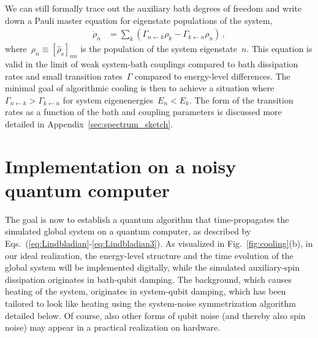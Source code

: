 \documentclass[twocolumn,amsmath,amssymb,pra]{revtex4-2}
\begin{document}
We can still formally trace out the auxiliary bath degrees of freedom and write down  
a Pauli master equation for eigenstate populations of the system,
\begin{align}
\dot\rho_{n} &=  \sum_k \left(\Gamma_{n\leftarrow k} \rho_{k} - \Gamma_{k\leftarrow n} \rho_{n}\right) \, ,
\end{align}
where~$\rho_n \equiv [\hat\rho_\textrm{s}]_{nn}$ is the population of the system eigenstate~$n$. 
This equation is valid in the limit of weak system-bath couplings compared to bath dissipation rates
and small transition rates~$\Gamma$ compared to energy-level differences.
The minimal goal of algorithmic cooling is then to achieve a situation where $\Gamma_{n \leftarrow k} > \Gamma_{k \leftarrow n}$ for system eigenenergies~$E_n < E_k$.
The form of the transition rates as a function of the bath and coupling parameters is discussed more detailed in Appendix~\ref{sec:spectrum_sketch}.













\section{Implementation on a noisy quantum computer}
\label{sec:implementation_on_hardware}
The goal is now to establish a quantum algorithm that time-propagates the simulated global system on a quantum computer,
as described by Eqs.~(\ref{eq:Lindbladian}-\ref{eq:Lindbladian3}).
As visualized in Fig.~\ref{fig:cooling}(b),
in our ideal realization, 
the energy-level structure and the time evolution of the global system will be implemented 
digitally, while the simulated auxiliary-spin dissipation originates in bath-qubit damping.
The background, which causes heating of the system, originates in system-qubit damping,
which has been tailored to look like heating using the system-noise symmetrization algorithm detailed below.
Of course, also other forms of qubit noise (and thereby also spin noise) may appear in a practical realization on hardware.
\end{document}
